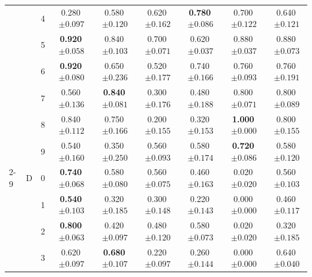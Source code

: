\begin{longtable}{lllcccccc}
 &  & 4 & 0.280$\,{\scriptstyle\pm0.097}$ & 0.580$\,{\scriptstyle\pm0.120}$ & 0.620$\,{\scriptstyle\pm0.162}$ & \textbf{0.780}$\,{\scriptstyle\pm0.086}$ & 0.700$\,{\scriptstyle\pm0.122}$ & 0.640$\,{\scriptstyle\pm0.121}$ \\
 &  & 5 & \textbf{0.920}$\,{\scriptstyle\pm0.058}$ & 0.840$\,{\scriptstyle\pm0.103}$ & 0.700$\,{\scriptstyle\pm0.071}$ & 0.620$\,{\scriptstyle\pm0.037}$ & 0.880$\,{\scriptstyle\pm0.037}$ & 0.880$\,{\scriptstyle\pm0.073}$ \\
 &  & 6 & \textbf{0.920}$\,{\scriptstyle\pm0.080}$ & 0.650$\,{\scriptstyle\pm0.236}$ & 0.520$\,{\scriptstyle\pm0.177}$ & 0.740$\,{\scriptstyle\pm0.166}$ & 0.760$\,{\scriptstyle\pm0.093}$ & 0.760$\,{\scriptstyle\pm0.191}$ \\
 &  & 7 & 0.560$\,{\scriptstyle\pm0.136}$ & \textbf{0.840}$\,{\scriptstyle\pm0.081}$ & 0.300$\,{\scriptstyle\pm0.176}$ & 0.480$\,{\scriptstyle\pm0.188}$ & 0.800$\,{\scriptstyle\pm0.071}$ & 0.800$\,{\scriptstyle\pm0.089}$ \\
 &  & 8 & 0.840$\,{\scriptstyle\pm0.112}$ & 0.750$\,{\scriptstyle\pm0.166}$ & 0.200$\,{\scriptstyle\pm0.155}$ & 0.320$\,{\scriptstyle\pm0.153}$ & \textbf{1.000}$\,{\scriptstyle\pm0.000}$ & 0.800$\,{\scriptstyle\pm0.155}$ \\
 &  & 9 & 0.540$\,{\scriptstyle\pm0.160}$ & 0.350$\,{\scriptstyle\pm0.250}$ & 0.560$\,{\scriptstyle\pm0.093}$ & 0.580$\,{\scriptstyle\pm0.174}$ & \textbf{0.720}$\,{\scriptstyle\pm0.086}$ & 0.580$\,{\scriptstyle\pm0.120}$ \\
\cmidrule(lr){2-9}
 & D & 0 & \textbf{0.740}$\,{\scriptstyle\pm0.068}$ & 0.580$\,{\scriptstyle\pm0.080}$ & 0.560$\,{\scriptstyle\pm0.075}$ & 0.460$\,{\scriptstyle\pm0.163}$ & 0.020$\,{\scriptstyle\pm0.020}$ & 0.560$\,{\scriptstyle\pm0.103}$ \\
 &  & 1 & \textbf{0.540}$\,{\scriptstyle\pm0.103}$ & 0.320$\,{\scriptstyle\pm0.185}$ & 0.300$\,{\scriptstyle\pm0.148}$ & 0.220$\,{\scriptstyle\pm0.143}$ & 0.000$\,{\scriptstyle\pm0.000}$ & 0.460$\,{\scriptstyle\pm0.117}$ \\
 &  & 2 & \textbf{0.800}$\,{\scriptstyle\pm0.063}$ & 0.420$\,{\scriptstyle\pm0.097}$ & 0.480$\,{\scriptstyle\pm0.120}$ & 0.580$\,{\scriptstyle\pm0.073}$ & 0.020$\,{\scriptstyle\pm0.020}$ & 0.320$\,{\scriptstyle\pm0.185}$ \\
 &  & 3 & 0.620$\,{\scriptstyle\pm0.097}$ & \textbf{0.680}$\,{\scriptstyle\pm0.107}$ & 0.220$\,{\scriptstyle\pm0.097}$ & 0.260$\,{\scriptstyle\pm0.144}$ & 0.000$\,{\scriptstyle\pm0.000}$ & 0.640$\,{\scriptstyle\pm0.040}$ \\

\end{longtable}

